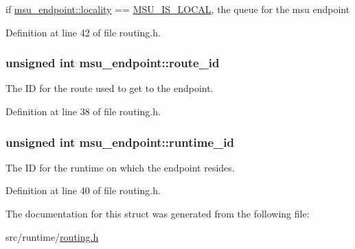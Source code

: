 if \hyperlink{structmsu__endpoint_aa06a2a0cc4c7ba40109635371acc8249}{msu\-\_\-endpoint\-::locality} == \hyperlink{dfg_8h_a97b014aefcfb738ba60c39a3bbd44c31a28350aae24171519a7e1f4811f157298}{M\-S\-U\-\_\-\-I\-S\-\_\-\-L\-O\-C\-A\-L}, the queue for the msu endpoint 



Definition at line 42 of file routing.\-h.

\hypertarget{structmsu__endpoint_a8ffa7bacf8556511dc2d4129107d4868}{
\subsubsection[{route\-\_\-id}]{\setlength{\rightskip}{0pt plus 5cm}unsigned int msu\-\_\-endpoint\-::route\-\_\-id}}\label{structmsu__endpoint_a8ffa7bacf8556511dc2d4129107d4868}


The I\-D for the route used to get to the endpoint. 



Definition at line 38 of file routing.\-h.

\hypertarget{structmsu__endpoint_aa0f75c3179e67f5f6b0edc166ebd3119}{
\subsubsection[{runtime\-\_\-id}]{\setlength{\rightskip}{0pt plus 5cm}unsigned int msu\-\_\-endpoint\-::runtime\-\_\-id}}\label{structmsu__endpoint_aa0f75c3179e67f5f6b0edc166ebd3119}


The I\-D for the runtime on which the endpoint resides. 



Definition at line 40 of file routing.\-h.



The documentation for this struct was generated from the following file\-:\begin{DoxyCompactItemize}
\item 
src/runtime/\hyperlink{routing_8h}{routing.\-h}\end{DoxyCompactItemize}
